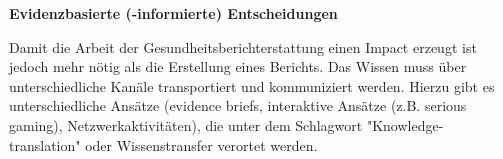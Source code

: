 \documentclass{article}
\begin{document}
\textbf{Evidenzbasierte (-informierte) Entscheidungen}


Damit die Arbeit der Gesundheitsberichterstattung einen Impact erzeugt ist jedoch mehr nötig als die Erstellung eines Berichts. Das Wissen muss über unterschiedliche Kanäle transportiert und kommuniziert werden. Hierzu gibt es unterschiedliche Ansätze (evidence briefs, interaktive Ansätze (z.B. serious gaming), Netzwerkaktivitäten), die unter dem Schlagwort "Knowledge-translation" oder Wissenstransfer verortet werden.


 







\begin{quote}






\end{quote}


\printbibliography[title={Literaturverzeichnis}]
\end{document}
